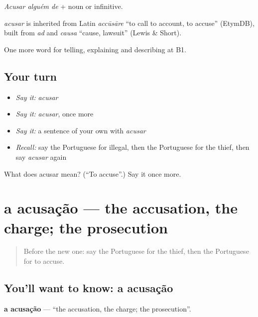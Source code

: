 \emph{Acusar alguém de} + noun or infinitive.

\begin{cousinweb}
\emph{acusar} is inherited from Latin \emph{accūsāre} \textquotedblleft{}to call to account, to accuse\textquotedblright{} (EtymDB), built from \emph{ad} and \emph{causa} \textquotedblleft{}cause, lawsuit\textquotedblright{} (Lewis \& Short).
\end{cousinweb}

\begin{grammarlens}[title={What you've built}]
One more word for telling, explaining and describing at B1.
\end{grammarlens}

\subsection*{Your turn}
\begin{itemize}
\raggedright
  \item \emph{Say it:} \emph{acusar}
  \item \emph{Say it:} \emph{acusar}, once more
  \item \emph{Say it:} a sentence of your own with \emph{acusar}
  \item \emph{Recall:} say the Portuguese for illegal, then the Portuguese for the thief, then say \emph{acusar} again
\end{itemize}

\begin{tcolorbox}[breakable,colback=teal!4,colframe=teal!35!black,title={Before you move on}]
What does acusar mean? (\textquotedblleft{}To accuse\textquotedblright{}.) Say it once more.
\end{tcolorbox}
\section[a acusação]{a acusação — the accusation, the charge; the prosecution}

\label{lesson:PT-C386-acusacao}



\begin{quote}
Before the new one: say the Portuguese for the thief, then the Portuguese for to accuse.
\end{quote}

\subsection*{You'll want to know: a acusação}
\textbf{a acusação} — \textquotedblleft{}the accusation, the charge; the prosecution\textquotedblright{}.

